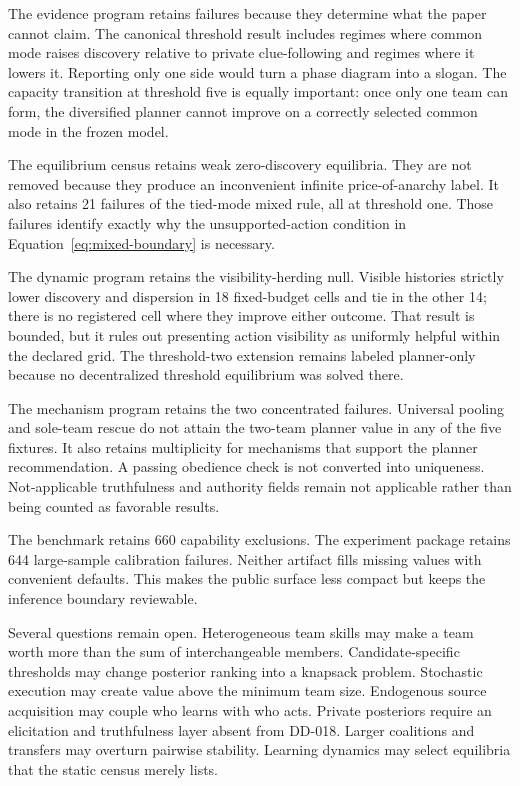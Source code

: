 \documentclass[11pt]{article}
\begin{document}
The evidence program retains failures because they determine what the paper
cannot claim. The canonical threshold result includes regimes where common
mode raises discovery relative to private clue-following and regimes where it
lowers it. Reporting only one side would turn a phase diagram into a slogan.
The capacity transition at threshold five is equally important: once only one
team can form, the diversified planner cannot improve on a correctly selected
common mode in the frozen model.

The equilibrium census retains weak zero-discovery equilibria. They are not
removed because they produce an inconvenient infinite price-of-anarchy label.
It also retains 21 failures of the tied-mode mixed rule, all at threshold one.
Those failures identify exactly why the unsupported-action condition in
Equation~\ref{eq:mixed-boundary} is necessary.

The dynamic program retains the visibility-herding null. Visible histories
strictly lower discovery and dispersion in 18 fixed-budget cells and tie in the
other 14; there is no registered cell where they improve either outcome. That
result is bounded, but it rules out presenting action visibility as uniformly
helpful within the declared grid. The threshold-two extension remains labeled
planner-only because no decentralized threshold equilibrium was solved there.

The mechanism program retains the two concentrated failures. Universal pooling
and sole-team rescue do not attain the two-team planner value in any of the five
fixtures. It also retains multiplicity for mechanisms that support the planner
recommendation. A passing obedience check is not converted into uniqueness.
Not-applicable truthfulness and authority fields remain not applicable rather
than being counted as favorable results.

The benchmark retains 660 capability exclusions. The experiment package
retains 644 large-sample calibration failures. Neither artifact fills missing
values with convenient defaults. This makes the public surface less compact but
keeps the inference boundary reviewable.

Several questions remain open. Heterogeneous team skills may make a team worth
more than the sum of interchangeable members. Candidate-specific thresholds
may change posterior ranking into a knapsack problem. Stochastic execution may
create value above the minimum team size. Endogenous source acquisition may
couple who learns with who acts. Private posteriors require an elicitation and
truthfulness layer absent from DD-018. Larger coalitions and transfers may
overturn pairwise stability. Learning dynamics may select equilibria that the
static census merely lists.
\end{document}
